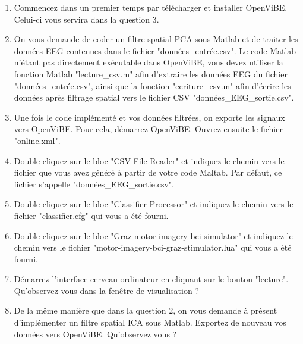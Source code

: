 \begin{enumerate}
	\smallbreak
	\item Commencez dans un premier temps par télécharger et installer OpenViBE. Celui-ci vous servira dans la question 3. 
	\smallbreak
	\item On vous demande de coder un filtre spatial PCA sous Matlab et de traiter les données EEG contenues dans le fichier "données\_entrée.csv". Le code Matlab n'étant pas directement exécutable dans OpenViBE, vous devez utiliser la fonction Matlab "lecture\_csv.m" afin d'extraire les données EEG du fichier "données\_entrée.csv", ainsi que la fonction "ecriture\_csv.m" afin d'écrire les données après filtrage spatial vers le fichier CSV "données\_EEG\_sortie.csv".
	\smallbreak
	\item Une fois le code implémenté et vos données filtrées, on exporte les signaux vers OpenViBE. Pour cela, démarrez OpenViBE. Ouvrez ensuite le fichier "online.xml".
	\smallbreak
	\item Double-cliquez sur le bloc "CSV File Reader" et indiquez le chemin vers le fichier que vous avez généré à partir de votre code Maltab. Par défaut, ce fichier s'appelle "données\_EEG\_sortie.csv". 
	\smallbreak
	\item Double-cliquez sur le bloc "Classifier Processor" et indiquez le chemin vers le fichier "classifier.cfg" qui vous a été fourni.
	\smallbreak
	\item Double-cliquez sur le bloc "Graz motor imagery bci simulator" et indiquez le chemin vers le fichier "motor-imagery-bci-graz-stimulator.lua" qui vous a été fourni.
	\smallbreak
	\item Démarrez l'interface cerveau-ordinateur en cliquant sur le bouton "lecture". Qu'observez vous dans la fenêtre de visualisation ? 
	\smallbreak 
	\item De la même manière que dans la question 2, on vous demande à présent d'implémenter un filtre spatial ICA sous Matlab. Exportez de nouveau vos données vers OpenViBE. Qu'observez vous ? 
\end{enumerate}

